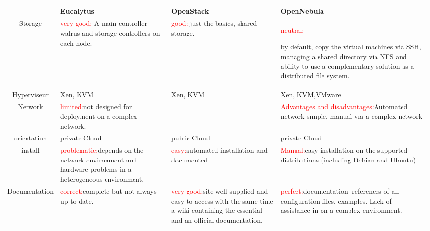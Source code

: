 \begin{tabular}{|c|p{4.5cm}|p{4cm}|p{4.5cm}|}
\hline
    &Eucalytus &OpenStack &OpenNebula \\ \hline
Storage   & \textcolor{red}{very good:} A main controller walrus and storage controllers on each node.&\textcolor{red}{good:} just the basics, shared storage.&\textcolor{red}{neutral:}

by default, copy the virtual machines via SSH, managing a shared directory via NFS and ability to use a complementary solution as a distributed file system.\\ \hline
Hyperviseur    &Xen, KVM	&Xen, KVM	&Xen, KVM,VMware\\ \hline
Network    &\textcolor{red}{limited:}not designed for deployment on a complex network.&	&\textcolor{red}{Advantages and disadvantages:}Automated network simple, manual via a complex network\\ \hline
orientation    &private Cloud &public Cloud  &private Cloud \\ \hline
install    &\textcolor{red}{problematic:}depends on the network environment and hardware problems in a heterogeneous environment.&\textcolor{red}{easy:}automated installation and documented.	&\textcolor{red}{Manual:}easy installation on the supported distributions (including Debian and Ubuntu).\\ \hline
Documentation    &\textcolor{red}{correct:}complete but not always up to date.&\textcolor{red}{very good:}site well supplied and easy to access with the same time a wiki containing  the essential and an official documentation.	&\textcolor{red}{perfect:}documentation, references of all configuration files, examples. Lack of assistance in on a complex environment.		\\ \hline

\end{tabular}
\newpage
